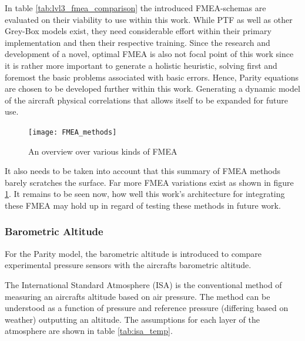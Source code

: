 In table \ref{tab:lvl3_fmea_comparison} the introduced FMEA-schemas are evaluated on their viability to use within this work. While PTF as well as other Grey-Box models exist, they need considerable effort within their primary implementation and then their respective training. Since the research and development of a novel, optimal FMEA is also not focal point of this work since it is rather more important to generate a holistic heuristic, solving first and foremost the basic problems associated with basic errors. Hence, Parity equations are chosen to be developed further within this work. Generating a dynamic model of the aircraft physical correlations that allows itself to be expanded for future use.


\begin{figure}
    \centering
    \texttt{[image: FMEA\_methods]}
    \caption{An overview over various kinds of FMEA \cite{zhang_bibliographical_2008}}
    \label{fig:FMEA-methods}
\end{figure}

It also needs to be taken into account that this summary of FMEA methods barely scratches the surface. Far more FMEA variations exist as shown in figure \ref{fig:FMEA-methods}. It remains to be seen now, how well this work's architecture for integrating these FMEA may hold up in regard of testing these methods in future work.

\subsubsection{Barometric Altitude}

For the Parity model, the barometric altitude is introduced to compare experimental pressure sensors with the aircrafts barometric altitude.

The International Standard Atmosphere (ISA) is the conventional method of measuring an aircrafts altitude based on air pressure. \cite{iso_standard_1975} The method can be understood as a function of pressure and reference pressure (differing based on weather) outputting an altitude. The assumptions for each layer of the atmosphere are shown in table \ref{tab:isa_temp}.

